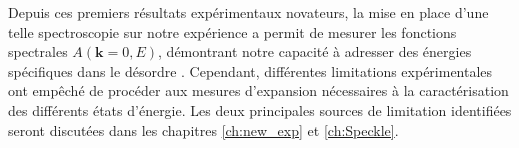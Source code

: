 Depuis ces premiers résultats expérimentaux novateurs, la mise en place d'une telle spectroscopie sur notre expérience a permit de mesurer les fonctions spectrales $A(\mathbf{k}=0,E)$, démontrant notre capacité à adresser des énergies spécifiques dans le désordre \citep{volchkov2018measurement}. Cependant, différentes limitations expérimentales ont empêché de procéder aux mesures d'expansion nécessaires à la caractérisation des différents états d'énergie. Les deux principales sources de limitation identifiées seront discutées dans les chapitres \ref{ch:new_exp} et \ref{ch:Speckle}.

